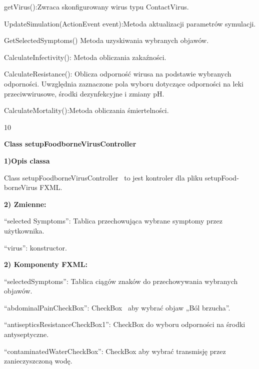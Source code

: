 \documentclass[a4paper]{article}
\begin{document}
\foreignlanguage{polish}{getVirus():Zwraca skonfigurowany wirus typu ContactVirus.}


\foreignlanguage{polish}{UpdateSimulation(ActionEvent event):Metoda aktualizacji parametrów symulacji.}

\foreignlanguage{polish}{GetSelectedSymptoms() Metoda uzyskiwania wybranych objawów.}

\foreignlanguage{polish}{CalculateInfectivity(): Metoda obliczania zakaźności.}

\foreignlanguage{polish}{CalculateResistance(): Oblicza odporność wirusa na podstawie wybranych odporności. Uwzględnia zaznaczone pola wyboru dotyczące odporności na leki przeciwwirusowe, środki dezynfekcyjne i zmiany pH.}

\foreignlanguage{polish}{CalculateMortality():Metoda obliczania śmiertelności.}
\begin{center}
	10
\end{center}
\newpage


\bigskip


\bigskip

{\centering
\foreignlanguage{english}{\textbf{Class setupFoodborneVirusController}}
\par}
\vspace{6pt}
\foreignlanguage{english}{\textbf{1)Opis classa}}

\foreignlanguage{english}{Class setupFoodborneVirusController \ to jest kontroler dla pliku setupFoodborneVirus FXML.}
\bigskip

\foreignlanguage{english}{\textbf{2) Zmienne:}}

\foreignlanguage{polish}{“selected Symptoms”: Tablica przechowująca wybrane symptomy przez użytkownika.}

\foreignlanguage{polish}{“virus”: konstructor. }

\bigskip

\foreignlanguage{polish}{\textbf{2) Komponenty FXML:}}

\foreignlanguage{polish}{“selectedSymptoms”: Tablica ciągów znaków do przechowywania wybranych objawów.}

\foreignlanguage{polish}{“abdominalPainCheckBox”: CheckBox \ aby wybrać objaw „Ból brzucha”. \ }

\foreignlanguage{polish}{“antisepticsResistanceCheckBox1”: CheckBox do wyboru odporności na środki antyseptyczne.}

\foreignlanguage{polish}{“contaminatedWaterCheckBox”: CheckBox aby wybrać transmisję przez zanieczyszczoną wodę.}
\end{document}
